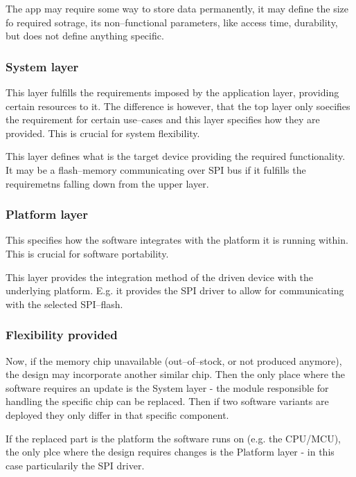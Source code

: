 \documentclass[preprint,12pt, a4paper]{elsarticle}
\begin{document}
The app may require some way to store data permanently, it may define the size fo required sotrage, its non--functional parameters, like access time, durability, but does not define anything specific.

\subsubsection{System layer}
This layer fulfills the requirements imposed by the application layer, providing certain resources to it. The difference is however, that the top layer only soecifies the requirement for certain use--cases and this layer specifies how they are provided. This is crucial for system flexibility.

This layer defines what is the target device providing the required functionality. It may be a flash--memory communicating over SPI bus if it fulfills the requiremetns falling down from the upper layer.

\subsubsection{Platform layer}
This specifies how the software integrates with the platform it is running within. This is crucial for software portability.

This layer provides the integration method of the driven device with the underlying platform. E.g. it provides the SPI driver to allow for communicating with the selected SPI--flash.

\subsubsection{Flexibility provided}
Now, if the memory chip unavailable (out--of--stock, or not produced anymore), the design may incorporate another similar chip. Then the only place where the software requires an update is the System layer - the module responsible for handling the specific chip can be replaced. Then if two software variants are deployed they only differ in that specific component.

If the replaced part is the platform the software runs on (e.g. the CPU/MCU), the only plce where the design requires changes is the Platform layer - in this case particularily the SPI driver.

\end{document}
